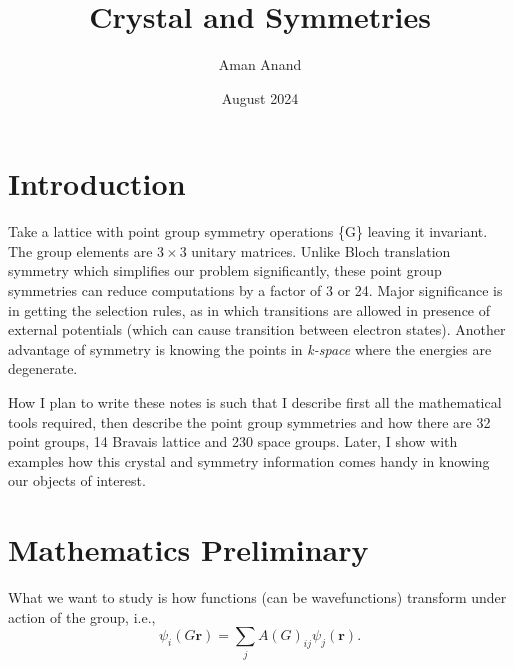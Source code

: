 \documentclass{article}
\title{Crystal and Symmetries}
\author{Aman Anand}
\date{August 2024}
\begin{document}
	
	\maketitle
	
	\section{Introduction}
	Take a lattice with point group symmetry operations \{G\} leaving it invariant. The group elements are $3 \times 3$ unitary matrices. Unlike Bloch translation symmetry which simplifies our problem significantly, these point group symmetries can reduce computations by a factor of 3 or 24. Major significance is in getting the selection rules, as in which transitions are allowed in presence of external potentials (which can cause transition between electron states). Another advantage of symmetry is knowing the points in \textit{k-space} where the energies are degenerate.
	
	How I plan to write these notes is such that I describe first all the mathematical tools required, then describe the point group symmetries and how there are 32 point groups, 14 Bravais lattice and 230 space groups. Later, I show with examples how this crystal and symmetry information comes handy in knowing our objects of interest.
	
	\section{Mathematics Preliminary}
	What we want to study is how functions (can be wavefunctions) transform under action of the group, i.e.,
	\begin{equation}
		\psi_i (G\mathbf{r}) = \sum_j A(G)_{ij} \psi_j (\mathbf{r}) .
	\end{equation}
\end{document}
